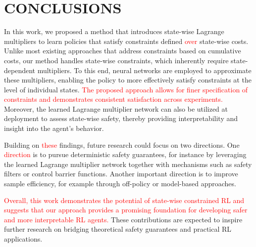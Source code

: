 \section{CONCLUSIONS}

In this work, we proposed a method that introduces state-wise Lagrange multipliers to learn policies that satisfy constraints defined \textcolor{red}{over} state-wise costs.
Unlike most existing approaches that address constraints based on cumulative costs, our method handles state-wise constraints, which inherently require state-dependent multipliers.
To this end, neural networks are employed to approximate these multipliers, enabling the policy to more effectively satisfy constraints at the level of individual states.
\textcolor{red}{The proposed approach allows for finer specification of constraints and demonstrates consistent satisfaction across experiments.}
Moreover, the learned Lagrange multiplier network can also be utilized at deployment to assess state-wise safety, thereby providing interpretability and insight into the agent’s behavior.

Building on \textcolor{red}{these} findings, future research could focus on two directions.
One \textcolor{red}{direction} is to pursue deterministic safety guarantees, for instance by leveraging the learned Lagrange multiplier network together with mechanisms such as safety filters or control barrier functions.
Another important direction is to improve sample efficiency, for example through off-policy or model-based approaches.

\textcolor{red}{Overall, this work demonstrates the potential of state-wise constrained RL and suggests that our approach provides a promising foundation for developing safer and more interpretable RL agents.}
These contributions are expected to inspire further research on bridging theoretical safety guarantees and practical RL applications.